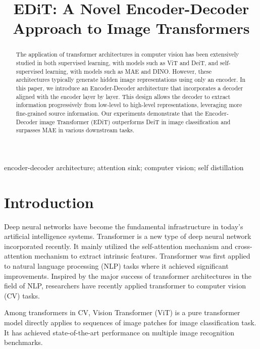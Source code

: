 \documentclass[anon,12pt]{colt2024} %
\title[Short Title]{
  EDiT: A Novel Encoder-Decoder Approach to Image Transformers
  }
\begin{document}
\maketitle

\begin{abstract}%
The application of transformer architectures in computer vision has been extensively studied in both supervised learning, with models such as ViT and DeiT, and self-supervised learning, with models such as MAE and DINO. 
However, these architectures typically generate hidden image representations using only an encoder. 
In this paper, we introduce an Encoder-Decoder architecture that incorporates a decoder aligned with the encoder layer by layer. This design allows the decoder to extract information progressively from low-level to high-level representations, leveraging more fine-grained source information. 
Our experiments demonstrate that the Encoder-Decoder image Transformer (EDiT) outperforms DeiT in image classification and surpasses MAE in various downstream tasks.

\end{abstract}

\begin{keywords}%
  encoder-decoder architecture; attention sink; computer vision; self distillation%
\end{keywords}

\section{Introduction}

Deep neural networks have become the fundamental infrastructure in today's artificial intelligence systems. 
Transformer \cite{vaswani2017attention} is a new type of deep neural network incorporated recently.
It mainly utilized the self-attention mechanism and cross-attention mechanism to extract intrinsic features.
Transformer was first applied to natural language processing (NLP) tasks \cite{vaswani2017attention, devlin2018bert,radford2018improving, brown2020language,ouyang2022training} where it achieved significant improvements.
Inspired by the major success of transformer architectures in the field of NLP, researchers have recently applied transformer to computer vision (CV) tasks.

Among transformers in CV, Vision Transformer (ViT) is a pure transformer model directly applies to sequences of image patches for image classification task.
It has achieved state-of-the-art performance on multiple image recognition benchmarks.
\end{document}
